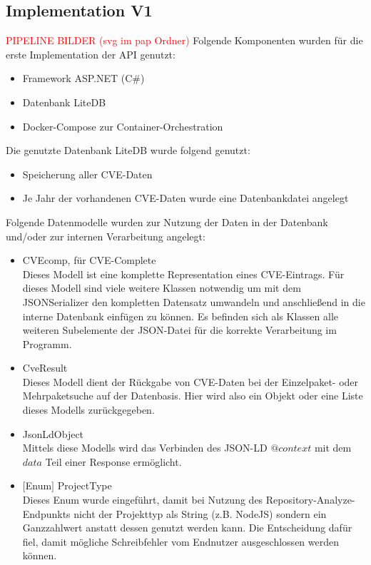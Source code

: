 \subsection{Implementation V1} \label{sec:Implementation1}
    \textcolor{red}{PIPELINE BILDER (svg im pap Ordner)}
    Folgende Komponenten wurden für die erste Implementation der \ac{API} genutzt:
    \begin{itemize}
        \item Framework ASP.NET (C\#)
        \item Datenbank LiteDB
        \item Docker-Compose zur Container-Orchestration
    \end{itemize}

    Die genutzte Datenbank LiteDB wurde folgend genutzt:
    \begin{itemize}
        \item Speicherung aller \ac{CVE}-Daten
        \item Je Jahr der vorhandenen \ac{CVE}-Daten wurde eine Datenbankdatei angelegt
    \end{itemize}

    Folgende Datenmodelle wurden zur Nutzung der Daten in der Datenbank und/oder zur internen Verarbeitung angelegt:
    \begin{itemize}
        \item CVEcomp, für CVE-Complete \\
            Dieses Modell ist eine komplette Representation eines \ac{CVE}-Eintrags.
            Für dieses Modell sind viele weitere Klassen notwendig um mit dem JSONSerializer den kompletten Datensatz umwandeln und anschließend in die interne Datenbank einfügen zu können.
            Es befinden sich als Klassen alle weiteren Subelemente der \ac{JSON}-Datei für die korrekte Verarbeitung im Programm.
        \item CveResult \\
            Dieses Modell dient der Rückgabe von \ac{CVE}-Daten bei der Einzelpaket- oder Mehrpaketsuche auf der Datenbasis.
            Hier wird also ein Objekt oder eine Liste dieses Modells zurückgegeben.
        \item JsonLdObject \\
            Mittels diese Modells wird das Verbinden des \ac{JSON-LD} \textit{$@context$} mit dem \textit{$data$} Teil einer Response ermöglicht.
        \item $[$Enum$]$ ProjectType \\
            Dieses Enum wurde eingeführt, damit bei Nutzung des Repository-Analyze-Endpunkts nicht der Projekttyp als String (z.B. NodeJS) sondern ein Ganzzahlwert anstatt dessen genutzt werden kann.
            Die Entscheidung dafür fiel, damit mögliche Schreibfehler vom Endnutzer ausgeschlossen werden können.
    \end{itemize}

